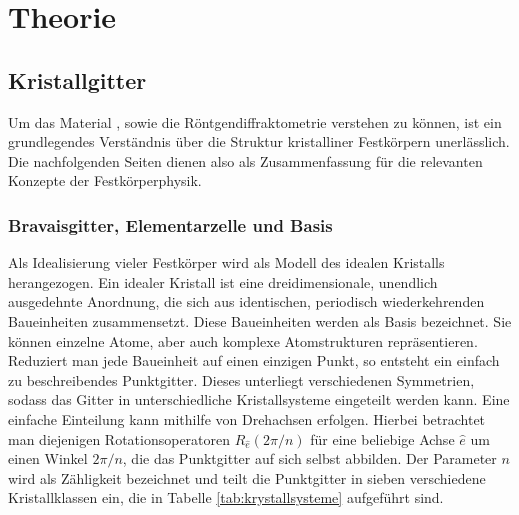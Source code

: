 \section{Theorie}

\subsection{Kristallgitter}
Um das Material \heo, sowie die Röntgendiffraktometrie verstehen zu können, ist ein grundlegendes Verständnis
über die Struktur kristalliner Festkörpern unerlässlich.
Die nachfolgenden Seiten dienen also als Zusammenfassung für die relevanten Konzepte der Festkörperphysik.

\subsubsection{Bravaisgitter, Elementarzelle und Basis}
Als Idealisierung vieler Festkörper wird als Modell des idealen Kristalls herangezogen.
Ein idealer Kristall ist eine dreidimensionale, unendlich ausgedehnte Anordnung, die sich aus identischen, periodisch
wiederkehrenden Baueinheiten zusammensetzt.
Diese Baueinheiten werden als Basis bezeichnet.
Sie können einzelne Atome, aber auch komplexe Atomstrukturen repräsentieren.
Reduziert man jede Baueinheit auf einen einzigen Punkt, so entsteht ein einfach zu beschreibendes Punktgitter.
\autocite[49]{Hunklinger}
Dieses unterliegt verschiedenen Symmetrien, sodass das Gitter in unterschiedliche Kristallsysteme eingeteilt werden
kann.
Eine einfache Einteilung kann mithilfe von Drehachsen erfolgen.
Hierbei betrachtet man diejenigen Rotationsoperatoren $R_{\hat{e}}(2\pi / n)$ für eine beliebige Achse $\hat{e}$ um
einen Winkel $2 \pi /n$, die das Punktgitter auf sich selbst abbilden.
Der Parameter $n$ wird als Zähligkeit bezeichnet und teilt die Punktgitter in sieben verschiedene Kristallklassen ein,
die in Tabelle \cref{tab:krystallsysteme} aufgeführt sind.
\autocite[53]{Hunklinger}
